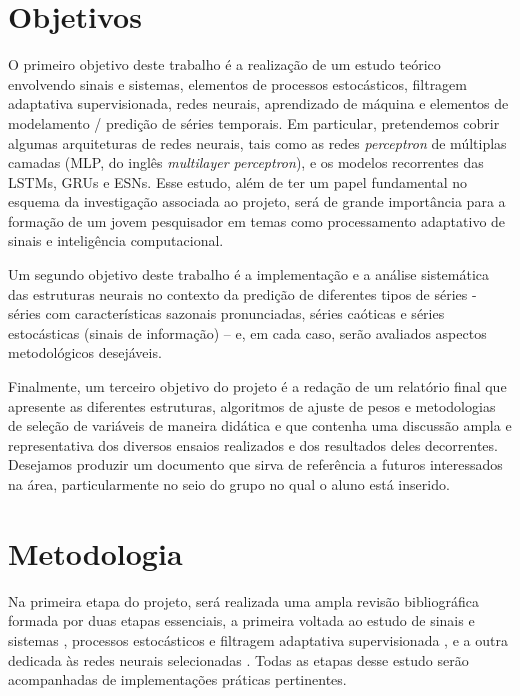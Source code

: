 \documentclass[a4paper, 12pt]{article}
\begin{document}
\section{Objetivos}

O primeiro objetivo deste trabalho é a realização de um estudo teórico envolvendo sinais e sistemas, elementos de processos estocásticos, filtragem adaptativa supervisionada, redes neurais, aprendizado de máquina e elementos de modelamento / predição de séries temporais. Em particular, pretendemos cobrir algumas arquiteturas de redes neurais, tais como as redes \textit{perceptron} de múltiplas camadas (MLP, do inglês \textit{multilayer perceptron}), e os modelos recorrentes das LSTMs, GRUs e ESNs. Esse estudo, além de ter um papel fundamental no esquema da investigação associada ao projeto, será de grande importância para a formação de um jovem pesquisador em temas como processamento adaptativo de sinais e inteligência computacional.

Um segundo objetivo deste trabalho é a implementação e a análise sistemática das estruturas neurais no contexto da predição de diferentes tipos de séries - séries com características sazonais pronunciadas, séries caóticas e séries estocásticas (sinais de informação) – e, em cada caso, serão avaliados aspectos metodológicos desejáveis.

Finalmente, um terceiro objetivo do projeto é a redação de um relatório final que apresente as diferentes estruturas, algoritmos de ajuste de pesos e metodologias de seleção de variáveis de maneira didática e que contenha uma discussão ampla e representativa dos diversos ensaios realizados e dos resultados deles decorrentes. Desejamos produzir um documento que sirva de referência a futuros interessados na área, particularmente no seio do grupo no qual o aluno está inserido.

\section{Metodologia}

Na primeira etapa do projeto, será realizada uma ampla revisão bibliográfica formada por duas etapas essenciais, a primeira voltada ao estudo de sinais e sistemas \cite{oppenheim1996signals}, processos estocásticos e filtragem adaptativa supervisionada \cite{haykin2008adaptive}, e a outra dedicada às redes neurais selecionadas \cite{haykin2010neural, geron2019hands}. Todas as etapas desse estudo serão acompanhadas de implementações práticas pertinentes.
\end{document}
